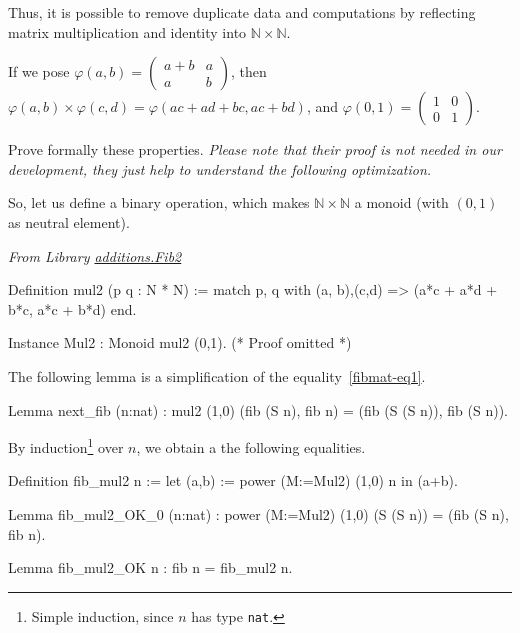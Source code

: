 Thus, it is possible to remove duplicate data and computations by reflecting matrix multiplication and identity into $\mathbb{N}\times\mathbb{N}$.

If we pose $\varphi(a,b) =\left(
  \begin{array}{cc}
    a+b  & a \\
    a & b
  \end{array}
\right)$, then $\varphi(a,b)\times \varphi(c,d)=\varphi(ac + ad + bc, ac + bd)$, and
$\varphi(0,1)=  \left(
  \begin{array}{cc}
    1 & 0 \\
    0 & 1 
  \end{array}
\right) $.

\begin{exercise}
  Prove formally these properties. \emph{Please note that their proof is not needed in our development, they just help to understand the following optimization.}
\end{exercise}


So, let us define a binary operation, which makes $\mathbb{N}\times\mathbb{N}$ a monoid (with $(0,1)$ as neutral element).


\emph{From Library
\href{../theories/html/hydras.additions.Fib2.html}{additions.Fib2}}

\begin{Coqsrc}
Definition mul2 (p q : N * N) :=
  match p, q with (a, b),(c,d) => (a*c + a*d + b*c, a*c + b*d) end.

Instance Mul2 : Monoid  mul2 (0,1).
(* Proof omitted *)
\end{Coqsrc}

The following lemma is a simplification of the equality~\vref{fibmat-eq1}.

\begin{Coqsrc}
Lemma next_fib (n:nat) : mul2 (1,0) (fib (S n), fib n) =
                         (fib (S (S n)), fib (S n)).  
\end{Coqsrc}

By induction\footnote{Simple induction, since $n$ has type \texttt{nat}.}
 over $n$, we obtain a the following equalities.

\begin{Coqsrc}
Definition fib_mul2 n := let (a,b) := power (M:=Mul2) (1,0) n   in (a+b).

Lemma fib_mul2_OK_0 (n:nat) : power (M:=Mul2) (1,0) (S (S n)) =
                              (fib (S n), fib n).

Lemma fib_mul2_OK n : fib n = fib_mul2 n.
\end{Coqsrc}

